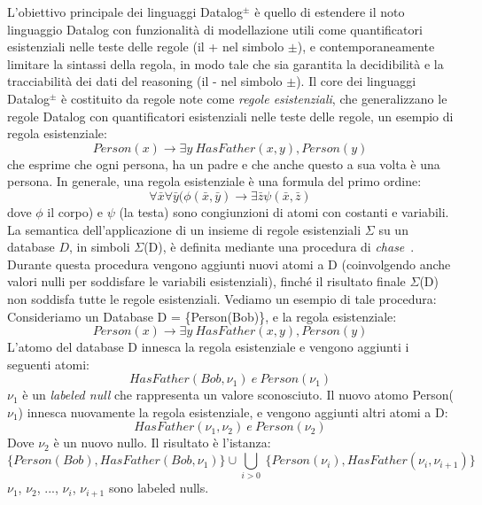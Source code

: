 L'obiettivo principale dei linguaggi Datalog$^\pm$ è quello di estendere il noto linguaggio Datalog con funzionalità di modellazione utili come quantificatori esistenziali nelle teste delle regole (il + nel simbolo $\pm $), e contemporaneamente limitare la sintassi della regola, in modo tale che sia garantita la decidibilità e la tracciabilità dei dati del reasoning (il - nel simbolo $\pm $). \newline
Il core dei linguaggi Datalog$^\pm $ è costituito da regole note come \emph{regole esistenziali}, che generalizzano le regole Datalog con quantificatori esistenziali nelle teste delle regole, un esempio di regola esistenziale: \[Person(x) \rightarrow \exists y ~HasFather(x,y), Person(y)\]
che esprime che ogni persona, ha un padre e che anche questo a sua volta è una persona. \newline
In generale, una regola esistenziale è una formula del primo ordine: \[\forall \bar{x} \forall \bar{y} (\phi(\bar{x}, \bar{y}) \rightarrow \exists \bar{z} \psi (\bar{x}, \bar{z})\]
dove $\phi$ il corpo) e $\psi$  (la testa) sono congiunzioni di atomi con costanti e variabili. \newline
La semantica dell'applicazione di un insieme di regole esistenziali $\Sigma$ su un database $D$, in simboli $\Sigma$(D), è definita mediante una procedura di \emph{chase}~\cite{fagin2005data}. Durante questa procedura vengono aggiunti nuovi atomi a D (coinvolgendo anche valori nulli per soddisfare le variabili esistenziali), finché il risultato finale $\Sigma$(D) non soddisfa tutte le regole esistenziali. \newline
Vediamo un esempio di tale procedura: \newline
Consideriamo un Database D = \{Person(Bob)\}, e la regola esistenziale: \[Person(x) \rightarrow \exists y ~HasFather(x,y), Person(y)\]
L'atomo del database D innesca la regola esistenziale e vengono aggiunti i seguenti atomi: \[HasFather(Bob, \nu_{1}) ~e~ Person(\nu_{1})\]
$\nu_{1}$ è un \emph{labeled null} che rappresenta un valore sconosciuto.\newline
Il nuovo atomo Person($\nu_{1}$) innesca nuovamente la regola esistenziale, e vengono aggiunti altri atomi a D: \[HasFather(\nu_{1}, \nu_{2}) ~e~ Person(\nu_{2})\]
Dove $\nu_{2}$ è un nuovo nullo. Il risultato è l'istanza: \[\{Person(Bob), HasFather(Bob, \nu_{1})\} \cup \underset{i>0}{\bigcup} ~\{Person(\nu_{i}), HasFather(\nu_{i}, \nu_{i+1})\}\]
$\nu_{1}$, $\nu_{2}$, ..., $\nu_{i}$, $\nu_{i+1}$ sono labeled nulls. \newline \newline
